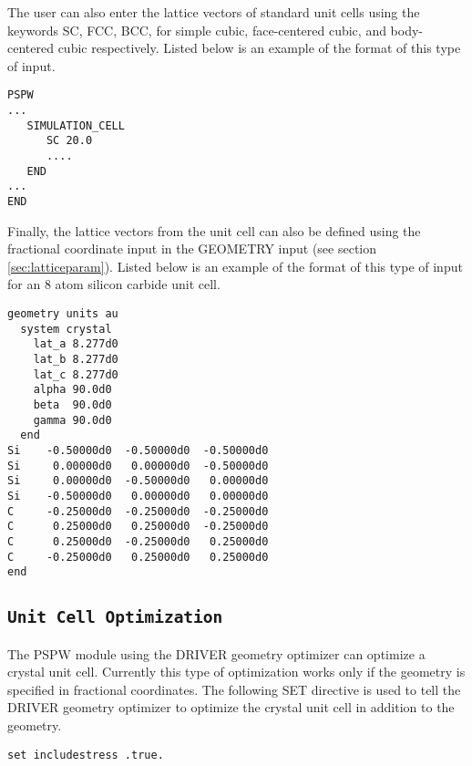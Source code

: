 The user can also enter the lattice vectors of standard unit cells using the
keywords SC, FCC, BCC, for simple cubic, face-centered cubic, and body-centered cubic
respectively.  Listed below is an example of the format of this type of input.
\begin{verbatim}
PSPW
...
   SIMULATION_CELL
      SC 20.0
      ....
   END
...
END
\end{verbatim}

Finally, the lattice vectors from the unit cell can also be defined using
the fractional coordinate input in the GEOMETRY input (see section \ref{sec:latticeparam}).   
Listed below is an example of the format of this type of input for an 8 atom silicon carbide unit cell.
\begin{verbatim}
geometry units au 
  system crystal
    lat_a 8.277d0
    lat_b 8.277d0
    lat_c 8.277d0
    alpha 90.0d0
    beta  90.0d0
    gamma 90.0d0
  end
Si    -0.50000d0  -0.50000d0  -0.50000d0
Si     0.00000d0   0.00000d0  -0.50000d0
Si     0.00000d0  -0.50000d0   0.00000d0
Si    -0.50000d0   0.00000d0   0.00000d0
C     -0.25000d0  -0.25000d0  -0.25000d0
C      0.25000d0   0.25000d0  -0.25000d0
C      0.25000d0  -0.25000d0   0.25000d0
C     -0.25000d0   0.25000d0   0.25000d0
end
\end{verbatim}



\subsection{\tt Unit Cell Optimization}
\label{sec:pspw_cell_optimization}

The PSPW module using the DRIVER geometry optimizer can optimize a crystal unit cell.
Currently this type of optimization works only if the geometry is specified in fractional
coordinates.  The following SET directive is used to tell the DRIVER geometry optimizer to
optimize the crystal unit cell in addition to the geometry.
\begin{verbatim}
set includestress .true.
\end{verbatim}

\normalsize
